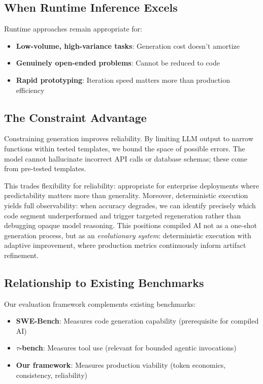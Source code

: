 \documentclass[11pt]{article}
\begin{document}
\subsection{When Runtime Inference Excels}

Runtime approaches remain appropriate for:
\begin{itemize}
    \item \textbf{Low-volume, high-variance tasks}: Generation cost doesn't amortize
    \item \textbf{Genuinely open-ended problems}: Cannot be reduced to code
    \item \textbf{Rapid prototyping}: Iteration speed matters more than production efficiency
\end{itemize}

\subsection{The Constraint Advantage}

Constraining generation improves reliability. By limiting LLM output to narrow functions within tested templates, we bound the space of possible errors. The model cannot hallucinate incorrect API calls or database schemas; these come from pre-tested templates.

This trades flexibility for reliability: appropriate for enterprise deployments where predictability matters more than generality. Moreover, deterministic execution yields full observability: when accuracy degrades, we can identify precisely which code segment underperformed and trigger targeted regeneration rather than debugging opaque model reasoning. This positions compiled AI not as a one-shot generation process, but as an \emph{evolutionary system}: deterministic execution with adaptive improvement, where production metrics continuously inform artifact refinement.

\subsection{Relationship to Existing Benchmarks}

Our evaluation framework complements existing benchmarks:
\begin{itemize}
    \item \textbf{SWE-Bench}: Measures code generation capability (prerequisite for compiled AI)
    \item \textbf{$\tau$-bench}: Measures tool use (relevant for bounded agentic invocations)
    \item \textbf{Our framework}: Measures production viability (token economics, consistency, reliability)
\end{itemize}
\end{document}

